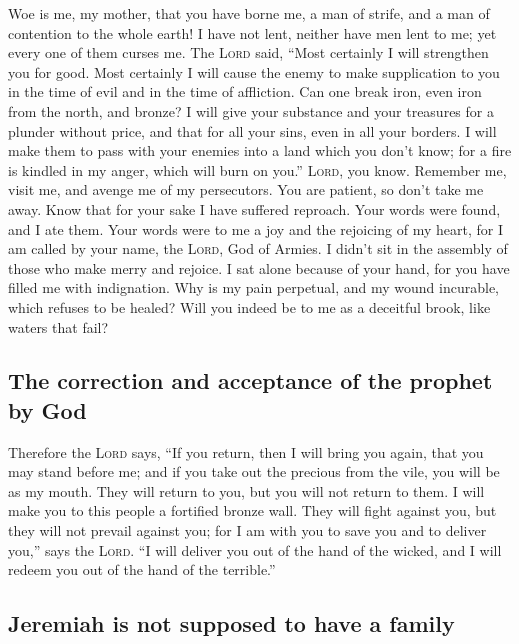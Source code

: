  Woe is me, my mother, that you have borne me, a man of
strife, and a man of contention to the whole earth! I have not lent,
neither have men lent to me; yet every one of them curses me.
 The \textsc{Lord} said, ``Most certainly I will
strengthen you for good. Most certainly I will cause the enemy to make
supplication to you in the time of evil and in the time of affliction.
 Can one break iron, even iron from the north, and
bronze?  I will give your substance and your treasures
for a plunder without price, and that for all your sins, even in all
your borders.  I will make them to pass with your enemies
into a land which you don't know; for a fire is kindled in my anger,
which will burn on you.''  \textsc{Lord}, you know.
Remember me, visit me, and avenge me of my persecutors. You are patient,
so don't take me away. Know that for your sake I have suffered reproach.
 Your words were found, and I ate them. Your words were
to me a joy and the rejoicing of my heart, for I am called by your name,
the \textsc{Lord}, God of Armies.  I didn't sit in the
assembly of those who make merry and rejoice. I sat alone because of
your hand, for you have filled me with indignation.  Why
is my pain perpetual, and my wound incurable, which refuses to be
healed? Will you indeed be to me as a deceitful brook, like waters that
fail?

\hypertarget{the-correction-and-acceptance-of-the-prophet-by-god}{%
\subsection{The correction and acceptance of the prophet by
God}\label{the-correction-and-acceptance-of-the-prophet-by-god}}

 Therefore the \textsc{Lord} says, ``If you return, then
I will bring you again, that you may stand before me; and if you take
out the precious from the vile, you will be as my mouth. They will
return to you, but you will not return to them.  I will
make you to this people a fortified bronze wall. They will fight against
you, but they will not prevail against you; for I am with you to save
you and to deliver you,'' says the \textsc{Lord}.  ``I
will deliver you out of the hand of the wicked, and I will redeem you
out of the hand of the terrible.''

\hypertarget{jeremiah-is-not-supposed-to-have-a-family}{%
\subsection{Jeremiah is not supposed to have a
family}\label{jeremiah-is-not-supposed-to-have-a-family}}

